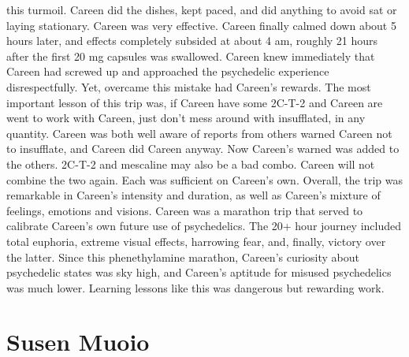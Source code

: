 \documentclass[12pt]{book}
\begin{document}
this turmoil. Careen did the dishes, kept paced, and did anything to avoid sat or laying stationary. Careen was very effective. Careen finally calmed down about 5 hours later, and effects completely subsided at about 4 am, roughly 21 hours after the first 20 mg capsules was swallowed. Careen knew immediately that Careen had screwed up and approached the psychedelic experience disrespectfully. Yet, overcame this mistake had Careen's rewards. The most important lesson of this trip was, if Careen have some 2C-T-2 and Careen are went to work with Careen, just don't mess around with insufflated, in any quantity. Careen was both well aware of reports from others warned Careen not to insufflate, and Careen did Careen anyway. Now Careen's warned was added to the others. 2C-T-2 and mescaline may also be a bad combo. Careen will not combine the two again. Each was sufficient on Careen's own. Overall, the trip was remarkable in Careen's intensity and duration, as well as Careen's mixture of feelings, emotions and visions. Careen was a marathon trip that served to calibrate Careen's own future use of psychedelics. The 20+ hour journey included total euphoria, extreme visual effects, harrowing fear, and, finally, victory over the latter. Since this phenethylamine marathon, Careen's curiosity about psychedelic states was sky high, and Careen's aptitude for misused psychedelics was much lower. Learning lessons like this was dangerous but rewarding work.



\chapter{Susen Muoio}
\end{document}
